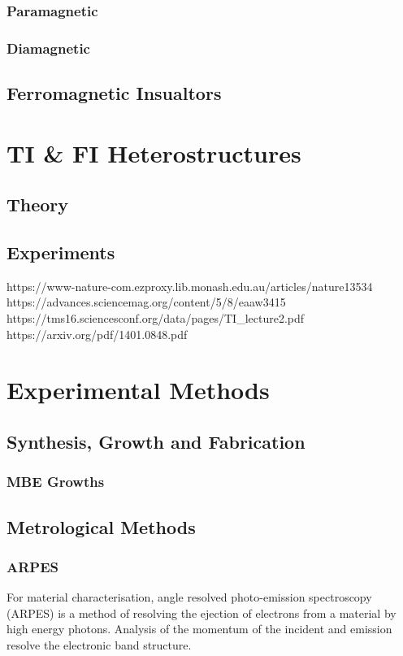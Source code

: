 \documentclass{article} %
\begin{document}
\subsubsection{Paramagnetic}
\subsubsection{Diamagnetic}
\subsection{Ferromagnetic Insualtors}

\section{TI \& FI Heterostructures}
\subsection{Theory}
\subsection{Experiments}
https://www-nature-com.ezproxy.lib.monash.edu.au/articles/nature13534
https://advances.sciencemag.org/content/5/8/eaaw3415
https://tms16.sciencesconf.org/data/pages/TI\_lecture2.pdf
https://arxiv.org/pdf/1401.0848.pdf


\section{Experimental Methods}

\subsection{Synthesis, Growth and Fabrication}
\subsubsection{MBE Growths}

\subsection{Metrological Methods}
\subsubsection{ARPES}
For material characterisation, angle resolved photo-emission spectroscopy (ARPES) is a method of resolving the ejection of electrons from a material by high energy photons. Analysis of the momentum of the incident and emission resolve the electronic band structure. 
\end{document}
